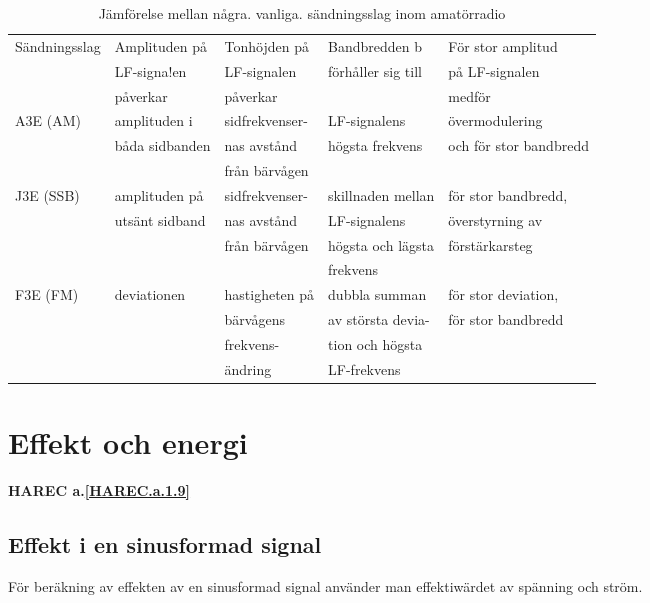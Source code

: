 \begin{table*}[h]
\begin{center}
\begin{tabular}{|l|l|l|l|l|}
\hline
Sändningsslag & Amplituden på & Tonhöjden på & Bandbredden b      & För stor amplitud \\
              & LF-signa!en   & LF-signalen  & förhåller sig till & på LF-signalen \\
              & påverkar      & påverkar     &                    & medför \\ \hline
A3E (AM) & amplituden i   & sidfrekvenser- & LF-signalens    & övermodulering \\
         & båda sidbanden & nas avstånd    & högsta frekvens & och för stor bandbredd \\
         &                & från bärvågen  & & \\
J3E (SSB)& amplituden på  & sidfrekvenser- & skillnaden mellan & för stor bandbredd,\\
         & utsänt sidband & nas avstånd    & LF-signalens      & överstyrning av\\
         &                & från bärvågen  & högsta och lägsta & förstärkarsteg\\
         &                &                & frekvens          & \\
F3E (FM) & deviationen    & hastigheten på & dubbla summan     & för stor deviation,\\
         &                & bärvågens      & av största devia- & för stor bandbredd\\
         &                & frekvens-      & tion och högsta   & \\
         &                & ändring        & LF-frekvens       & \\ \hline
\end{tabular}
\end{center}
\caption{Jämförelse mellan några. vanliga. sändningsslag inom amatörradio}
\end{table*}

\cleardoublepage

\section{Effekt och energi}
\textbf{HAREC a.\ref{HAREC.a.1.9}\label{myHAREC.a.1.9}}

\subsection{Effekt i en sinusformad signal}
För beräkning av effekten av en sinusformad signal använder man effektiwärdet
av spänning och ström.

